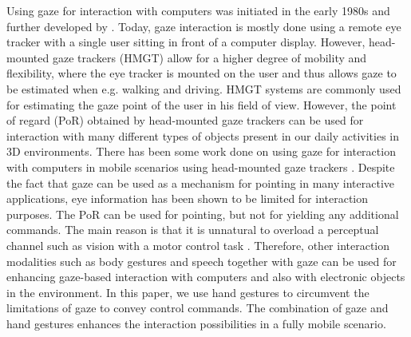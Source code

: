 \documentclass[jou,a4paper,notxfonts]{apa}
\begin{document}
Using gaze for interaction with computers was initiated in the early 1980s \cite{bolt1982eyes} and further developed by \cite{ware1987evaluation}. Today, gaze interaction is mostly done using a remote eye tracker with a single user sitting in front of a
computer display. However, head-mounted gaze trackers (HMGT) allow for a higher degree of mobility and flexibility,
where the eye tracker is mounted on the user and thus allows gaze to be estimated when e.g. walking and driving. HMGT
systems are commonly used for estimating the gaze point of the user in his field of view. However, the point of regard
(PoR) obtained by head-mounted gaze trackers can be used for interaction with many different types of objects present in
our daily activities in 3D environments. There has been some work done on using gaze for interaction with computers in
mobile scenarios using head-mounted gaze trackers \cite{Mardanbegi2011}. Despite the fact that gaze can be used as a mechanism for pointing in many interactive applications, eye information has been shown to be limited for interaction purposes.
The PoR can be used for pointing, but not for yielding any additional commands. The main reason is that it is unnatural
to overload a perceptual channel such as vision with a motor control task \cite{magicPointing}.
Therefore, other interaction modalities such as body gestures and speech together with gaze can be used for enhancing
gaze-based interaction with computers and also with electronic objects in the environment.  In this paper, we use
hand gestures to circumvent the limitations of gaze to convey control commands. The combination of gaze and hand
gestures enhances the interaction possibilities in a fully mobile scenario.
 
\end{document}
